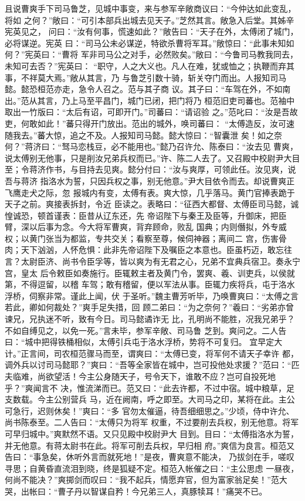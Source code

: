 且说曹爽手下司马鲁芝，见城中事变，来与参军辛敞商议曰：“今仲达如此变乱，将如
之何？”敞曰：“可引本部兵出城去见天子。”芝然其言。敞急入后堂。其姊辛宪英见之，
问曰：“汝有何事，慌速如此？”敞告曰：“天子在外，太傅闭了城门，必将谋逆。宪英
曰：“司马公未必谋逆，特欲杀曹将军耳。”敞惊曰：“此事未知如何？”宪英曰：“曹将
军非司马公之对手，必然败矣。”敞曰：“今鲁司马教我同去，未知可去否？”宪英曰：
“职守，人之大义也。凡人在难，犹或恤之；执鞭而弃其事，不祥莫大焉。”敞从其言，乃
与鲁芝引数十骑，斩关夺门而出。人报知司马懿。懿恐桓范亦走，急令人召之。范与其子商
议。其子曰：“车驾在外，不如南出。”范从其言，乃上马至平昌门，城门已闭，把门将乃
桓范旧吏司蕃也。范袖中取出一竹版曰：“太后有诏，可即开门。”司蕃曰：“请诏验
之。”范叱曰：“汝是吾故吏，何敢如此！”蕃只得开门放出。范出的城外，唤司蕃曰：
“太傅造反，汝可速随我去。”蕃大惊，追之不及。人报知司马懿。懿大惊曰：“智囊泄
矣！如之奈何？”蒋济曰：“驽马恋栈豆，必不能用也。”懿乃召许允、陈泰曰：“汝去见
曹爽，说太傅别无他事，只是削汝兄弟兵权而已。”许、陈二人去了。又召殿中校尉尹大目
至；令蒋济作书，与目持去见爽。懿分付曰：“汝与爽厚，可领此任。汝见爽，说吾与蒋济
指洛水为誓，只因兵权之事，别无他意。”尹大目依令而去。却说曹爽正飞鹰走犬之际，忽
报城内有变，太傅有表。爽大惊，几乎落马。黄门官捧表跪于天子之前。爽接表拆封，令近
臣读之。表略曰：“征西大都督、太傅臣司马懿，诚惶诚恐，顿首谨表：臣昔从辽东还，先
帝诏陛下与秦王及臣等，升御床，把臣臂，深以后事为念。今大将军曹爽，背弃顾命，败乱
国典；内则僭拟，外专威权；以黄门张当为都监，专共交关；看察至尊，候伺神器；离间二
宫，伤害骨肉；天下汹汹，人怀危惧：此非先帝诏陛下及嘱臣之本意也。臣虽朽迈，敢忘往
言？太尉臣济、尚书令臣孚等，皆以爽为有无君之心，兄弟不宜典兵宿卫。奏永宁宫，皇太
后令敕臣如奏施行。臣辄敕主者及黄门令，罢爽、羲、训吏兵，以侯就第，不得逗留，以稽
车驾；敢有稽留，便以军法从事。臣辄力疾将兵，屯于洛水浮桥，伺察非常。谨此上闻，伏
于圣听。”魏主曹芳听毕，乃唤曹爽曰：“太傅之言若此，卿如何裁处？”爽手足失措，回
顾二弟曰：“为之奈何？”羲曰：“劣弟亦曾谏兄，兄执迷不听，致有今日。司马懿谲诈无
比，孔明尚不能胜，况我兄弟乎？不如自缚见之，以免一死。”言未毕，参军辛敞、司马鲁
芝到。爽问之。二人告曰：“城中把得铁桶相似，太傅引兵屯于洛水浮桥，势将不可复归。
宜早定大计。”正言间，司农桓范骤马而至，谓爽曰：“太傅已变，将军何不请天子幸许
都，调外兵以讨司马懿耶？”爽曰：“吾等全家皆在城中，岂可投他处求援？”范曰：“匹
夫临难，尚欲望活！今主公身随天子，号令天下，谁敢不应？岂可自投死地乎？”爽闻言不
决，惟流涕而已。范又曰：“此去许都，不过中宿。城中粮草，足支数载。今主公别营兵
马，近在阙南，呼之即至。大司马之印，某将在此。主公可急行，迟则休矣！”爽曰：“多
官勿太催逼，待吾细细思之。”少顷，侍中许允、尚书陈泰至。二人告曰：“太傅只为将军
权重，不过要削去兵权，别无他意。将军可早归城中。”爽默然不语。又只见殿中校尉尹大
目到。目曰：“太傅指洛水为誓，并无他意。有蒋太尉书在此。将军可削去兵权，早归相
府。”爽信为良言。桓范又告曰：“事急矣，休听外言而就死地！”是夜，曹爽意不能决，
乃拔剑在手，嗟叹寻思；自黄昏直流泪到晓，终是狐疑不定。桓范入帐催之曰：“主公思虑
一昼夜，何尚不能决？”爽掷剑而叹曰：“我不起兵，情愿弃官，但为富家翁足矣！”范大
哭，出帐曰：“曹子丹以智谋自矜！今兄弟三人，真豚犊耳！”痛哭不已。

